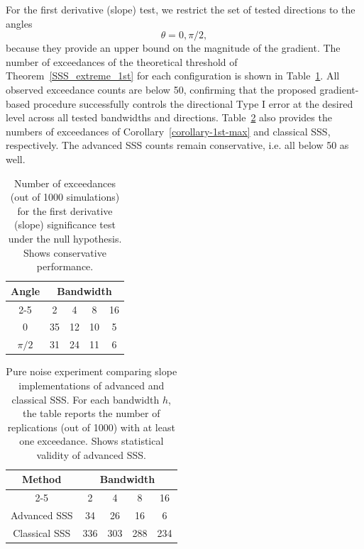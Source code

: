 \documentclass{article}
\begin{document}
For the first derivative (slope) test, 
we restrict the set of tested directions to the angles \[\theta =  0, \pi/2,\] because they provide an upper bound on the magnitude of the gradient.
The number of exceedances of the theoretical threshold of Theorem~\ref{SSS_extreme_1st} for each configuration is shown in Table~\ref{sim_1st}. All observed exceedance counts are below 50, confirming that the proposed gradient-based procedure successfully controls the directional Type I error at the desired level across all tested bandwidths and directions. Table~\ref{sim_1st_corr} also provides the numbers of exceedances of Corollary~\ref{corollary-1st-max} and classical SSS, respectively. The advanced SSS counts remain conservative, i.e. all below 50 as well.

\begin{table}[htbp]
	\centering
	\caption{Number of exceedances (out of 1000 simulations)  for the first derivative (slope) significance test under the null hypothesis. Shows conservative performance. }
	\label{sim_1st}
	\begin{tabular}{|c|c|c|c|c|}
		\hline
		\multirow{2}{*}{Angle} &\multicolumn{4}{c|}{Bandwidth}    \\
		\cline{2-5}
		&2&4&8&16    \\
		\hline
		0&35&12&10&5\\
		\hline
		$\pi/2$&31&24&11&6\\
		\hline
	\end{tabular}
\end{table}

\begin{table}[htbp]
	\centering
	\caption{Pure noise experiment comparing slope implementations of advanced and classical SSS. For each bandwidth $h$, the table reports the number of replications (out of 1000) with at least one exceedance. Shows statistical validity of advanced SSS. }
	\label{sim_1st_corr}
	\begin{tabular}{|c|c|c|c|c|}
		\hline
		\multirow{2}{*}{Method} &\multicolumn{4}{c|}{Bandwidth}    \\
		\cline{2-5}
		&2&4&8&16    \\
		\hline
		Advanced SSS&34&26&16&6\\
		\hline
		Classical SSS&336&303&288&234\\
		\hline
	\end{tabular}
\end{table}
\end{document}
